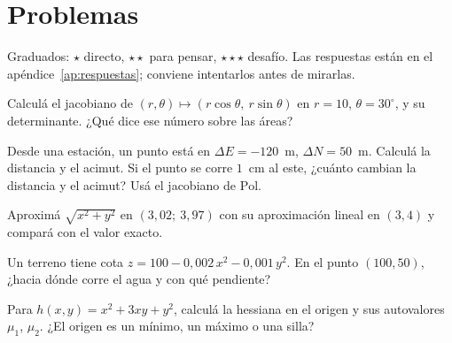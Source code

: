 \section{Problemas}\label{sec:problemas-10}

Graduados: \({\star}\) directo, \({\star}{\star}\) para pensar, \({\star}{\star}{\star}\) desafío. Las respuestas están en el apéndice~\ref{ap:respuestas}; conviene intentarlos antes de mirarlas.

\begin{problema}[\({\star}\)]\label{pb:10-1}
Calculá el jacobiano de \((r,\theta)\mapsto(r\cos\theta,\ r\sin\theta)\) en \(r=10\), \(\theta=30^\circ\), y su determinante. ¿Qué dice ese número sobre las áreas?
\end{problema}

\begin{problema}[\({\star}{\star}\)]\label{pb:10-2}
Desde una estación, un punto está en \(\Delta E=-120\)~m, \(\Delta N=50\)~m. Calculá la distancia y el acimut. Si el punto se corre \(1\)~cm al este, ¿cuánto cambian la distancia y el acimut? Usá el jacobiano de \(\mathrm{Pol}\).
\end{problema}

\begin{problema}[\({\star}{\star}\)]\label{pb:10-3}
Aproximá \(\sqrt{x^2+y^2}\) en \((3{,}02;\ 3{,}97)\) con su aproximación lineal en \((3,4)\) y compará con el valor exacto.
\end{problema}

\begin{problema}[\({\star}{\star}\)]\label{pb:10-4}
Un terreno tiene cota \(z=100-0{,}002\,x^2-0{,}001\,y^2\). En el punto \((100,50)\), ¿hacia dónde corre el agua y con qué pendiente?
\end{problema}

\begin{problema}[\({\star}{\star}{\star}\)]\label{pb:10-5}
Para \(h(x,y)=x^2+3xy+y^2\), calculá la hessiana en el origen y sus autovalores \(\mu_1\), \(\mu_2\). ¿El origen es un mínimo, un máximo o una silla?
\end{problema}

